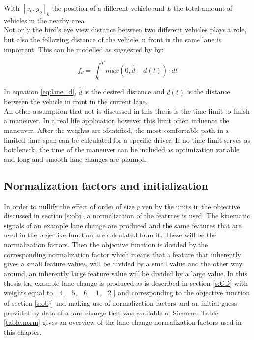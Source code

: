 With $[x_o,y_o]_k$ the position of a different vehicle and $L$ the total amount of vehicles in the nearby area.\\

Not only the bird's eye view distance between two different vehicles plays a role, but also the following distance of the vehicle in front in the same lane is important. This can be modelled as suggested by \cite{Kuderer2015a} by:  

\begin{equation}\label{eq:lane_d}
f_d= \int_{0}^{T} max(0,\hat{d}-d(t))\cdot dt
\end{equation}

In equation \ref{eq:lane_d}, $\hat{d}$ is the desired distance and $d(t)$ is the distance between the vehicle in front in the current lane.\\


An other assumption that not is discussed in this thesis is the time limit to finish a maneuver. In a real life application however this limit often influence the maneuver. After the weights are identified, the most comfortable path in a limited time span can be calculated for a specific driver. If no time limit serves as bottleneck, the time of the maneuver can be included as optimization variable and long and smooth lane changes are planned. 

\subsection{Normalization factors and initialization} \label{s:norm}
In order to nullify the effect of order of size given by the units in the objective discussed in section \ref{s:obj}, a normalization of the features is used. The kinematic signals of an example lane change are produced and the same features that are used in the objective function are calculated from it. These will be the normalization factors. Then the objective function is divided by the corresponding normalization factor which means that a feature that inherently gives a small feature values, will be divided by a small value and the other way around, an inherently large feature value will be divided by a large value. In this thesis the example lane change is produced as is described in section \ref{s:GD} with weights equal to $ \bigl[ \begin{smallmatrix} 4,&5,&6,&1,&2\end{smallmatrix}\bigr]$ and corresponding to the objective function of section \ref{s:obj} and making use of normalization factors and an initial guess provided by data of a lane change that was available at Siemens. Table \ref{table:norm} gives an overview of the lane change normalization factors used in this chapter. 

